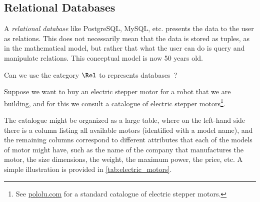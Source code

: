 \subsection{Relational Databases}
\label{def:relational-databases}

A \emph{relational database} like PostgreSQL, MySQL, etc. presents
the data to the user as relations. This does not necessarily mean
that the data is stored as tuples, as in the mathematical model, but
rather that what the user can do is query and manipulate relations.
This conceptual model is now 50 years old.

Can we use the category $\Rel$ to represents databases~\cite{codd2002relational}?

Suppose we want to buy an electric stepper motor for a robot that we are building, and for this we consult a catalogue of electric stepper motors\footnote{See \href{https://www.pololu.com/category/87/stepper-motors}{pololu.com} for a standard catalogue of electric stepper motors.}.

The catalogue might be organized as a large table, where on the left-hand side there is a column listing all available motors (identified with a model name), and the remaining columns correspond to different attributes that each of the models of motor might have, such as the name of the company that manufactures the motor, the size dimensions, the weight, the maximum power, the price, etc. A simple illustration is provided in \cref{tab:electric_motors}.

\begin{table}[h]
    \centering
    \caption{A simplified catalogue of motors.}
    \label{tab:electric_motors}
\end{table}


